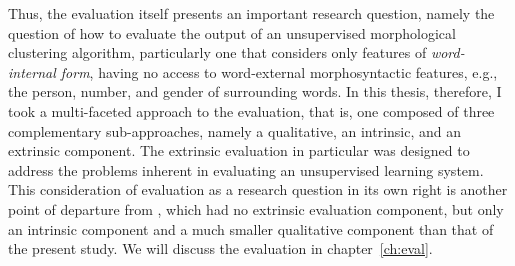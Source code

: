 Thus, the evaluation itself presents an important research question, namely the 
question of how to evaluate the output of an unsupervised morphological 
clustering algorithm, particularly one that considers only features of \emph{word-internal form}, 
having no access to word-external morphosyntactic features, e.g., the person, number, 
and gender of surrounding words. In this thesis, therefore, I took a multi-faceted 
approach to the evaluation, that is, one composed of three complementary sub-approaches, 
namely a qualitative, an intrinsic, and an extrinsic component. The extrinsic evaluation 
in particular was designed to address the problems inherent in evaluating an unsupervised 
learning system. This consideration of evaluation as a research question in its own right is 
another point of departure from \citet{meyer-and-dickinson:2016}, which had no extrinsic 
evaluation component, but only an intrinsic component and a much smaller qualitative 
component than that of the present study. We will discuss the evaluation in chapter~\ref{ch:eval}.

%

